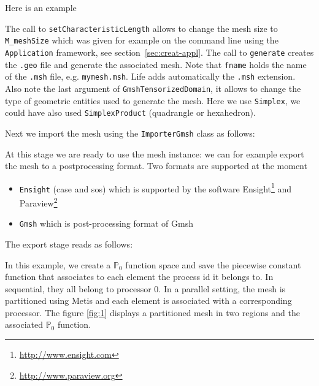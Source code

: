 \documentclass[a4paper]{book}
\newcommand{\polyP}[1]{\ensuremath{\mathbb{P}_{#1}}\xspace}
\newcommand{\life}{Life\xspace}
\begin{document}
Here is an example



The call to \lstinline!setCharacteristicLength! allows to change the
mesh size to \lstinline!M_meshSize! which was given for example on the
command line using the \lstinline!Application! framework, see
section~\ref{sec:creat-appl}. The call to \lstinline!generate! creates
the \lstinline!.geo! file and generate the associated mesh. Note that
\lstinline!fname! holds the name of the \lstinline!.msh! file,
e.g. \lstinline!mymesh.msh!. \life adds automatically the
\lstinline!.msh!  extension. Also note the last argument of
\lstinline!GmshTensorizedDomain!, it allows to change the type of
geometric entities used to generate the mesh. Here we use
\lstinline!Simplex!, we could have also used
\lstinline!SimplexProduct! (quadrangle or hexahedron).


Next we import the mesh using the
\lstinline!ImporterGmsh! class as follows:




At this stage we are ready to use the mesh instance: we can for
example export the mesh to a postprocessing format. Two formats are
supported at the moment
\begin{itemize}
\item \lstinline!Ensight! (case and sos) which is supported by the
  software Ensight\footnote{\url{http://www.ensight.com}} and
  Paraview\footnote{\url{http://www.paraview.org}}
\item \lstinline!Gmsh! which is post-processing format of Gmsh
\end{itemize}

The export stage reads as follows:



In this example, we create a $\polyP{0}$ function space and save the
piecewise constant function that associates to each element the
process id it belongs to. In sequential, they all belong to processor
0.  In a parallel setting, the mesh is partitioned using Metis and
each element is associated with a corresponding processor. The figure
\ref{fig:1} displays a partitioned mesh in two regions and the
associated $\polyP{0}$ function.
\end{document}
